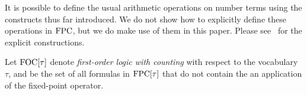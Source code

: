 \documentclass[../paper.tex]{subfiles}
\begin{document}
It is possible to define the usual arithmetic operations on number terms using
the constructs thus far introduced. We do not show how to explicitly define
these operations in $\text{\upshape FPC}$, but we do make use of them in this paper. Please
see~\cite{grohe2017descriptive} for the explicit constructions.

Let $\text{\upshape FOC}[\tau]$ denote \emph{first-order logic with counting} with respect to
the vocabulary $\tau$, and be the set of all formulas in $\text{\upshape FPC}[\tau]$ that do
not contain the an application of the fixed-point operator.



\end{document}
